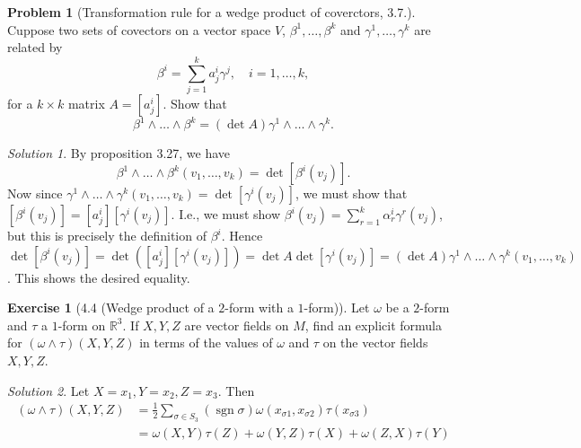 \documentclass[reqno]{amsart}
\theoremstyle{plain}%
\theoremstyle{definition}
\newtheorem{exercise}[theorem]{Exercise}
\newtheorem{problem}[theorem]{Problem}
\theoremstyle{remark}
\newtheorem*{solution}{Solution}
\DeclareMathOperator{\sgn}{sgn}
\begin{document}
\begin{problem}[Transformation rule for a wedge product of coverctors,
    3.7.]
    Cuppose two sets of covectors on a vector space
    $V$, $\beta^{1},\ldots, \beta^{k}$ and
    $\gamma^{1},\ldots, \gamma^{k}$ are related by
    \[
    \beta^{i} = \sum_{j=1}^{k} a_{j}^{i} \gamma^{j}, \quad
    i = 1,\ldots,k,
    \] 
    for a $k \times k$ matrix
    $A = \left[ a_{j}^{i} \right] $. Show that
    \[
    \beta^{1} \wedge \ldots \wedge \beta^{k} =
    \left( \det A \right) \gamma^{1} \wedge \ldots \wedge
    \gamma^{k}.
    \] 
\end{problem}

\begin{solution}
    By proposition 3.27, we have
    \[
    \beta^{1} \wedge \ldots \wedge \beta^{k}
    \left( v_1 , \ldots, v_k \right) =
    \det \left[ \beta^{i} \left( v_j \right)  \right] .
    \] 
    Now since 
    $\gamma^{1} \wedge \ldots \wedge \gamma^{k}
    \left( v_1, \ldots, v_k \right) 
    = \det \left[ \gamma^{i} \left( v_j \right)  \right] $,
    we must show that
    $ \left[ \beta^{i} \left( v_j \right)  \right] 
    = \left[ a_{j}^{i} \right] \left[ \gamma^{i}\left( v_j \right)  \right] 
    $. I.e., we must show
    $\beta^{i}\left( v_j \right) 
    = \sum_{r=1}^{k} \alpha^{i}_{r} \gamma^{r}\left( v_j \right) $, but
    this is precisely the definition of $\beta^{i}$. Hence
    $\det \left[ \beta^{i} (v_j) \right] 
    = \det \left( \left[ a_{j}^{i} \right] 
    \left[ \gamma^{i} \left( v_j \right)  \right] \right) 
    = \det A \det \left[ \gamma^{i} (v_j) \right] 
    = \left( \det A \right)  \gamma^{1} \wedge \ldots \wedge
    \gamma^{k} \left( v_1, \ldots, v_k \right) $.
    This shows the desired equality.
\end{solution}

\begin{exercise}[4.4 (Wedge product of a $2$-form with a 
    $1$-form)]
    Let $\omega $ be a $2$-form and $\tau$ a $1$-form
    on $\mathbb{R}^3$. If $X, Y, Z$ are vector fields on $M$, find
    an explicit formula for
    $\left( \omega  \wedge \tau \right) \left( X,Y,Z \right) $ in
    terms of the values of $\omega $ and $\tau$ on the vector
    fields $X,Y,Z$.
\end{exercise}

\begin{solution}
    Let $X = x_1, Y = x_2, Z = x_3$. Then
    \begin{align*}
        \left( \omega  \wedge \tau \right) \left( X,Y,Z \right) 
        &= \frac{1}{2} \sum_{\sigma \in S_3} \left( \sgn \sigma  \right) 
        \omega \left( x_{\sigma 1}, x_{\sigma  2} \right) 
        \tau \left( x_{\sigma  3} \right)\\
        &= \omega \left( X,Y \right) \tau (Z) +
        \omega \left( Y,Z \right) \tau (X)
        + \omega \left( Z,X \right) \tau(Y)
    \end{align*}
\end{solution}
\end{document}
